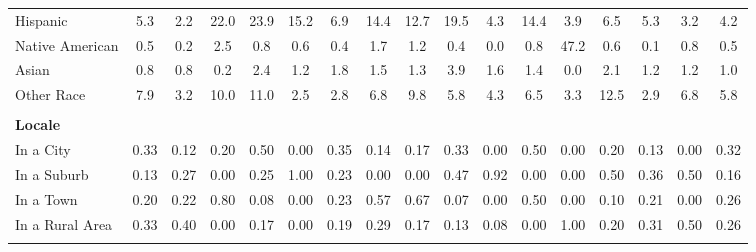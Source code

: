\begin{tabular*}{\linewidth}{@{\extracolsep{\fill} } lcccccccccccccccc}
\hspace{0.2cm}Hispanic&5.3&2.2&22.0&23.9&15.2&6.9&14.4&12.7&19.5&4.3&14.4&3.9&6.5&5.3&3.2&4.2\\%
\hspace{0.2cm}Native American&0.5&0.2&2.5&0.8&0.6&0.4&1.7&1.2&0.4&0.0&0.8&47.2&0.6&0.1&0.8&0.5\\%
\hspace{0.2cm}Asian&0.8&0.8&0.2&2.4&1.2&1.8&1.5&1.3&3.9&1.6&1.4&0.0&2.1&1.2&1.2&1.0\\%
\hspace{0.2cm}Other Race&7.9&3.2&10.0&11.0&2.5&2.8&6.8&9.8&5.8&4.3&6.5&3.3&12.5&2.9&6.8&5.8\\%
&&&&&&&&&&&&&&&&\\%
\multicolumn{17}{l}{\bfseries Locale}\\%
\hspace{0.2cm}In a City&0.33&0.12&0.20&0.50&0.00&0.35&0.14&0.17&0.33&0.00&0.50&0.00&0.20&0.13&0.00&0.32\\%
\hspace{0.2cm}In a Suburb&0.13&0.27&0.00&0.25&1.00&0.23&0.00&0.00&0.47&0.92&0.00&0.00&0.50&0.36&0.50&0.16\\%
\hspace{0.2cm}In a Town&0.20&0.22&0.80&0.08&0.00&0.23&0.57&0.67&0.07&0.00&0.50&0.00&0.10&0.21&0.00&0.26\\%
\hspace{0.2cm}In a Rural Area&0.33&0.40&0.00&0.17&0.00&0.19&0.29&0.17&0.13&0.08&0.00&1.00&0.20&0.31&0.50&0.26\\%
&&&&&&&&&&&&&&&&\\%
\hline%
\end{tabular*}